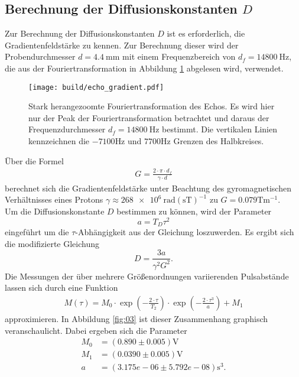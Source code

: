 \subsection{Berechnung der Diffusionskonstanten $D$}
\noindent Zur Berechnung der Diffusionskonstanten $D$ ist es erforderlich, die
Gradientenfeldstärke zu kennen. Zur Berechnung dieser wird der Probendurchmesser
$d = \SI{4.4}{\milli\meter}$ mit einem Frequenzbereich von $d_f = \SI{14800}{\hertz}$, die aus der Fouriertransformation in Abbildung \ref{fig:d_f} abgelesen wird, verwendet. 
\begin{figure}
  \texttt{[image: build/echo\_gradient.pdf]}
  \caption{Stark herangezoomte Fouriertransformation des Echos. Es wird hier nur der Peak der Fouriertransformation betrachtet und daraus der Frequenzdurchmesser $d_f = \SI{14800}{\hertz}$ bestimmt. Die vertikalen Linien kennzeichnen die $-7100\si{\hertz}$ und $7700\si{\hertz}$ Grenzen des Halbkreises.}
  \label{fig:d_f}
\end{figure}
Über die Formel
\begin{align}
  G = \frac{2 \cdot \pi \cdot d_f}{\gamma \cdot d}
  \label{eqn:05}
\end{align}
\noindent berechnet sich die Gradientenfeldstärke unter Beachtung des
gyromagnetischen Verhältnisses eines Protons $\gamma \approx \num{268e6} \:
\text{rad}(\si{\second\tesla})^{-1}$ zu
$G = \num{0.079} {\si{\tesla}}{\si{\meter}^{-1}}$. \\
\noindent Um die Diffusionskonstante $D$ bestimmen zu können, wird der Parameter
\begin{equation}
  a = T_D \tau^2
\end{equation}
eingeführt um die $\tau$-Abhängigkeit aus der Gleichung \label{diffusion_constant} loszuwerden.
Es ergibt sich die modifizierte Gleichung
\begin{equation}
  D = \frac{3a}{\gamma^2 G^2}.
  \label{eqn:diffusion_modifiziert}
\end{equation}
Die Messungen der über mehrere
Größenordnungen variierenden Pulsabstände lassen sich durch eine Funktion
\begin{align}
  M(\tau) = M_0 \cdot \exp{\left(- \frac{2 \cdot \tau}{T_2}\right)} \cdot \exp{\left(- \frac{2 \cdot \tau^3}{a}\right)} + M_1
 \label{eqn:06}
\end{align}
\noindent approximieren. In Abbildung \ref{fig:03} ist dieser Zusammenhang
graphisch veranschaulicht. Dabei ergeben sich die Parameter
\begin{align*}
  M_0 &=  (0.890  \pm  0.005)          \si{\volt} \\
  M_1 &=  (0.0390  \pm  0.005)         \si{\volt} \\
  a &=  (3.175e-06  \pm  5.792e-08) \si{\second^3}.
\end{align*}
